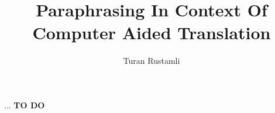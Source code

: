 \documentclass[msc,ai,logo,sansheadings]{infthesis}
\title{\bigskip \bigskip \bigskip \bigskip \bigskip \bigskip \bigskip Paraphrasing In Context Of \\ Computer Aided Translation}
\author{Turan Rustamli}
\begin{document}
\begin{preliminary}

\maketitle

\begin{acknowledgements}
... \textbf{TO DO}
\end{acknowledgements}

\standarddeclaration


\tableofcontents


\end{preliminary}









\appendix






\end{document}
